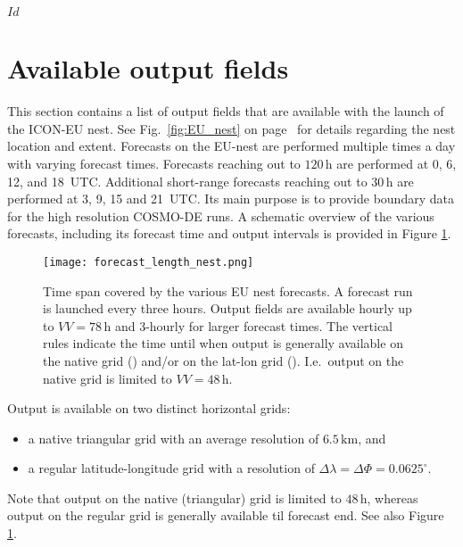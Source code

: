 \svnInfo $Id$


\section{Available output fields}\label{nest:sec_outfields}

This section contains a list of output fields that are available with
the launch of the ICON-EU nest. See Fig.~\ref{fig:EU_nest} on page~\pageref{fig:EU_nest} 
for details regarding the nest location and extent.
%
Forecasts on the EU-nest are performed multiple times a day with varying forecast times. Forecasts reaching out to $120\,\mathrm{h}$ 
are performed at 0, 6, 12, and 18~UTC. Additional short-range forecasts reaching out to $30\,\mathrm{h}$ are performed at 3, 9, 15 and 21~UTC. 
Its main purpose is to provide boundary data for the high resolution COSMO-DE runs. A schematic overview of the various forecasts, including its 
forecast time and output intervals is provided in Figure \ref{fig:forecast_length_nest}.
\begin{figure}[hbt]
 \centering
 \texttt{[image: forecast\_length\_nest.png]}
 \caption{Time span covered by the various EU nest forecasts. A forecast run is launched every three hours.
          Output fields are available hourly up to $VV=78\,\mathrm{h}$ and 3-hourly for larger forecast times. 
          The vertical rules indicate the time until when output is generally available on the native grid 
          (\protect\markRed) and/or on the lat-lon grid (\protect\markBlue). I.e.\ output on the native grid is 
          limited to $VV=48\,\mathrm{h}$.}\label{fig:forecast_length_nest}
\end{figure}

Output is available on two distinct horizontal grids: 
\begin{itemize}
  \item a native triangular grid with an average resolution of $6.5\,\mathrm{km}$, and
  \item a regular latitude-longitude grid with a resolution of $\Delta \lambda = \Delta \Phi=0.0625^{\circ}$. 
\end{itemize}
%
Note that output on the native (triangular) grid is limited to $48\,\mathrm{h}$, whereas output on the regular 
grid is generally available til forecast end. See also Figure \ref{fig:forecast_length_nest}.

